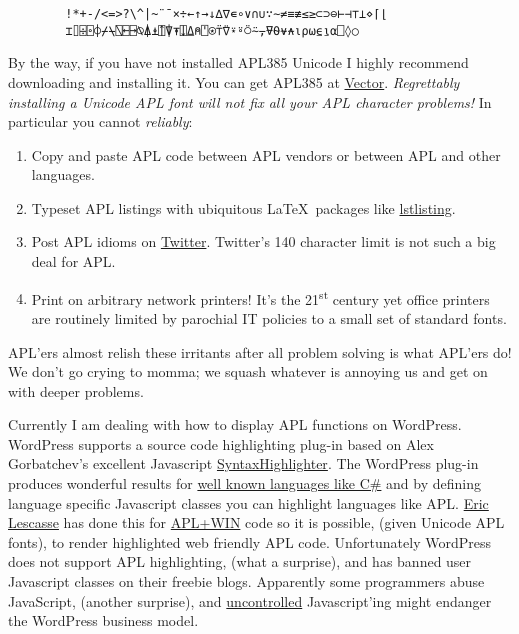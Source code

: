 \begin{center}
\setmonofont{APL385}
\begin{verbatim}
        !*+-/<=>?\^|~¨¯×÷←↑→↓∆∇∊∘∨∩∪∵∼≠≡≢≤≥⊂⊃⊖⊢⊣⊤⊥⋄⌈⌊ 
        ⌶⌷⌹⌻⌽⌿⍀⍂⍇⍈⍉⍋⍎⍐⍒⍕⍗⍙⍝⍞⍟⍡⍢⍣⍤⍥⍨⍪⍫⍬⍱⍲⍳⍴⍵⍷⍸⍺⎕◊○
\end{verbatim}
\setmonofont[Scale=MatchLowercase]{Ubuntu Mono}
\end{center}

By the way, if you have not installed APL385 Unicode I highly recommend
downloading and installing it. You can get APL385 at
\href{http://www.vector.org.uk/?area=home}{Vector}. \emph{Regrettably
installing a Unicode APL font will not fix all your APL character
problems!} In particular you cannot \emph{reliably}:

\begin{enumerate}
\item
  Copy and paste APL code between APL vendors or between APL and other
  languages.
\item
  Typeset APL listings with ubiquitous \LaTeX\ packages like
  \href{http://en.wikibooks.org/wiki/LaTeX/Packages/Listings}{lstlisting}.
\item
  Post APL idioms on \href{http://twitter.com/}{Twitter}. Twitter's 140
  character limit is not such a big deal for APL.
\item
  Print on arbitrary network printers! It's the 21\textsuperscript{st}
  century yet office printers are routinely limited by parochial IT
  policies to a small set of standard fonts.
\end{enumerate}
APL'ers almost relish these irritants after all problem solving is what
APL'ers do! We don't go crying to momma; we squash whatever is annoying
us and get on with deeper problems.

Currently I am dealing with how to display APL functions on WordPress.
WordPress supports a source code highlighting plug-in based on Alex
Gorbatchev's excellent Javascript
\href{http://alexgorbatchev.com/SyntaxHighlighter/}{SyntaxHighlighter}.
The WordPress plug-in produces wonderful results for
\href{http://bakerjd99.wordpress.com/2010/05/28/a-c-net-class-for-calling-j/}{well
known languages like C\#} and by defining language specific Javascript
classes you can highlight languages like APL.
\href{http://www.lescasse.com/UseAPLFromCSharpExample.aspx}{Eric
Lescasse} has done this for \href{http://www.apl2000.com/}{APL+WIN} code
so it is possible, (given Unicode APL fonts), to render highlighted web
friendly APL code. Unfortunately WordPress does not support APL
highlighting, (what a surprise), and has banned user Javascript classes
on their freebie blogs. Apparently some programmers abuse JavaScript,
(another surprise), and
\href{http://bakerjd99.wordpress.com/2010/06/11/the-real-problem-with-enterprise-software/}{uncontrolled}
Javascript'ing might endanger the WordPress business model.

